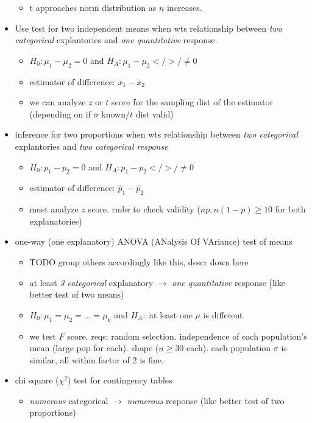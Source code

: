 \documentclass[11pt]{article}
\begin{document}
\begin{itemize}
\begin{itemize}
    \item t approaches norm distribution as $n$ increases.
  \end{itemize}
  \item Use test for two independent means when wts relationship between \emph{two categorical} explantories and \emph{one quantitative} response.
  \begin{itemize}
    \item $H_0: \mu_1 - \mu_2 = 0$ and $H_A: \mu_1 - \mu_2 </>/\ne 0$
    \item estimator of difference: $\overline{x}_1 - \overline{x}_2$
    \item we can analyze $z$ or $t$ score for the sampling dist of the estimator (depending on if $\sigma$ known/$t$ dist valid)
  \end{itemize}
  \item inference for two proportions when wts relationship between \emph{two categorical} explantories and \emph{two categorical response}
  \begin{itemize}
    \item $H_0: p_1 - p_2 = 0$ and $H_A: p_1 - p_2 </>/\ne 0$
    \item estimator of difference: $\hat{p}_1 - \hat{p}_2$
    \item must analyze $z$ score. rmbr to check validity ($np, n(1-p) \ge 10$ for both explanatories)
  \end{itemize}
  \item one-way (one explanatory) ANOVA (ANalysis Of VAriance) test of means
  \begin{itemize}
    \item TODO group others accordingly like this, descr down here
    \item at least \emph{3 categorical} explanatory $\rightarrow$ \emph{one quantitative} response (like better test of two means)
    \item $H_0: \mu_1 = \mu_2 = \dots = \mu_k$ and $H_A:$ at least one $\mu$ is different
    \item we test $F$ score. reqs: random selection. independence of each population's mean (large pop for each). shape ($n\ge 30$ each). each population $\sigma$ is similar, all within factor of 2 is fine.
  \end{itemize}
  \item chi square ($\chi ^2$) test for contingency tables
  \begin{itemize}
    \item \emph{numerous} categorical $\rightarrow$ \emph{numerous} response (like better test of two proportions)

\end{itemize}
\end{itemize}
\end{document}
